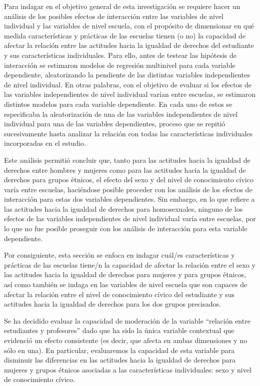 \documentclass[12pt,twoside]{templates/facsothesis}
\begin{document}
Para indagar en el objetivo general de esta investigación se requiere hacer un análisis de los posibles efectos de interacción entre las variables de nivel individual y las variables de nivel escuela, con el propósito de dimensionar en qué medida características y prácticas de las escuelas tienen (o no) la capacidad de afectar la relación entre las actitudes hacia la igualdad de derechos del estudiante y sus características individuales. Para ello, antes de testear las hipótesis de interacción se estimaron modelos de regresión multinivel para cada variable dependiente, aleatorizando la pendiente de las distintas variables independientes de nivel individual. En otras palabras, con el objetivo de evaluar si los efectos de las variables independientes de nivel individual varían entre escuelas, se estimaron distintos modelos para cada variable dependiente. En cada uno de estos se especificaba la aleatorización de una de las variables independientes de nivel individual para una de las variables dependientes, proceso que se repitió sucesivamente hasta analizar la relación con todas las características individuales incorporadas en el estudio.

Este análisis permitió concluir que, tanto para las actitudes hacia la igualdad de derechos entre hombres y mujeres como para las actitudes hacia la igualdad de derechos para grupos étnicos, el efecto del sexo y del nivel de conocimiento cívico varía entre escuelas, haciéndose posible proceder con los análisis de los efectos de interacción para estas dos variables dependientes. Sin embargo, en lo que refiere a las actitudes hacia la igualdad de derechos para homosexuales, ninguno de los efectos de las variables independientes de nivel individual varía entre escuelas, por lo que no fue posible proseguir con los análisis de interacción para esta variable dependiente.

Por consiguiente, esta sección se enfoca en indagar cuál/es características y prácticas de las escuelas tiene/n la capacidad de afectar la relación entre el sexo y las actitudes hacia la igualdad de derechos para mujeres y para grupos étnicos, así como también se indaga en las variables de nivel escuela que son capaces de afectar la relación entre el nivel de conocimiento cívico del estudiante y sus actitudes hacia la igualdad de derechos para los dos grupos precisados.

Se ha decidido evaluar la capacidad de moderación de la variable ``relación entre estudiantes y profesores'' dado que ha sido la única variable contextual que evidenció un efecto consistente (es decir, que afecta en ambas dimensiones y no sólo en una). En particular, evaluaremos la capacidad de esta variable para disminuir las diferencias en las actitudes hacia la igualdad de derechos para mujeres y grupos étnicos asociadas a las características individuales: sexo y nivel de conocimiento cívico.
\end{document}
